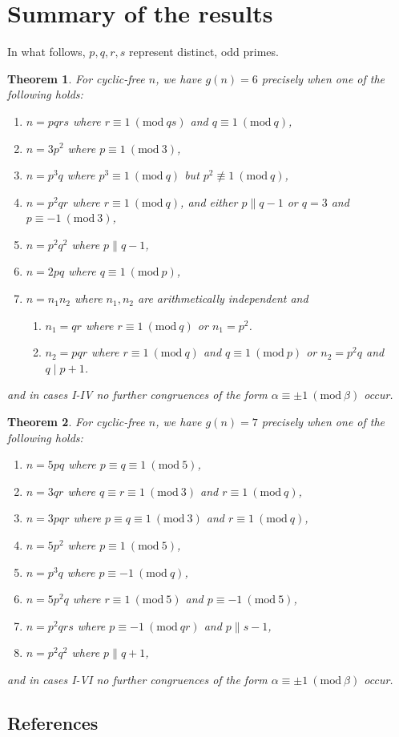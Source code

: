 \documentclass[draft]{article}
\newcommand{\Mod}[1]{\ (\mathrm{mod} \ #1)}
\theoremstyle{plain}
\newtheorem{thm}{Theorem}[section]
\theoremstyle{definition}
\begin{document}
\section{Summary of the results}
In what follows, $p, q, r, s$ represent distinct, odd primes.
\begin{thm}
	For cyclic-free $n$, we have $g(n) = 6$ precisely when one of the following holds:
	\begin{enumerate} \listspace
		\item $n = pqrs$ where $r \equiv 1 \Mod{qs}$ and $q \equiv 1 \Mod{q}$,
		\item $n = 3p^2$ where $p \equiv 1 \Mod{3}$,
		\item $n = p^3 q$ where $p^3 \equiv 1 \Mod{q}$ but $p^2 \not\equiv 1 \Mod{q}$,
		\item $n = p^2 q r$ where $r \equiv 1 \Mod{q}$, and either $p \parallel q - 1$ or $q = 3$ and $p \equiv -1 \Mod{3}$,
		\item $n = p^2 q^2$ where $p \parallel q - 1$,
		\item $n = 2pq$ where $q \equiv 1 \Mod{p}$,
		\item $n = n_1 n_2$ where $n_1, n_2$ are arithmetically independent and
		\begin{enumerate}
			\item $n_1 = qr$ where $r \equiv 1 \Mod{q}$ or $n_1 = p^2$.
			\item $n_2 = pqr$ where $r \equiv 1 \Mod{q}$ and $q \equiv 1 \Mod{p}$ or $n_2 = p^2 q$ and $q \mid p + 1$.
		\end{enumerate}
	\end{enumerate} \textspace
	and in cases I-IV no further congruences of the form $\alpha \equiv \pm 1 \Mod{\beta}$ \nolinebreak[4] \mbox{occur}.
\end{thm}
\begin{thm}
	For cyclic-free $n$, we have $g(n) = 7$ precisely when one of the following holds:
	\begin{enumerate}	\listspace
		\item $n = 5pq$ where $p \equiv q \equiv 1 \Mod{5}$,
		\item $n = 3qr$ where $q \equiv r \equiv 1 \Mod{3}$ and $r \equiv 1 \Mod{q}$,
		\item $n = 3pqr$ where $p \equiv q \equiv 1 \Mod{3}$ and $r \equiv 1 \Mod{q}$,
		\item $n = 5p^2$ where $p \equiv 1 \Mod{5}$,
		\item $n = p^3 q$ where $p \equiv -1 \Mod{q}$,
		\item $n = 5p^2 q$ where $r \equiv 1 \Mod{5}$ and $p \equiv -1 \Mod{5}$,
		\item $n = p^2 q r s$ where $p \equiv -1 \Mod{qr}$ and $p \parallel s - 1$,
		\item $n = p^2 q^2$ where $p \parallel q + 1$,
	\end{enumerate} \textspace
	and in cases I-VI no further congruences of the form $\alpha \equiv \pm 1 \Mod{\beta}$ \nolinebreak[4] \mbox{occur}.
\end{thm}

\begin{center}\section*{References}\end{center}
\printbibliography[heading=none]
\end{document}
